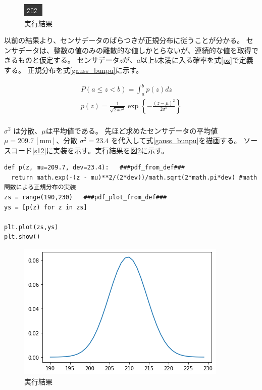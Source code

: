 \begin{figure}[htbp]
  \begin{center}
  \includegraphics[width=.1\linewidth]{img/11.png}
  \caption{実行結果}
  \label{j11}
  \end{center}
\end{figure}

以前の結果より、センサデータのばらつきが正規分布に従うことが分かる。
センサデータは、整数の値のみの離散的な値しかとらないが、連続的な値を取得できるものと仮定する。
センサデータ$z$が、$a$以上$b$未満に入る確率を式\eqref{pz}で定義する。
正規分布を式\eqref{gauss_bunpu}に示す。

\begin{align}
  P(a \leq z < b) = \int_{a}^{b} p(z) dz \label{pz} \\
  p(z) = \frac{1}{\sqrt{2\pi\sigma^2}}\exp \left\{-\frac{(z-\mu)^2}{2\sigma^2}\right\} \label{gauss_bunpu}
\end{align}
\\
$\sigma^2$ は分散、$\mu$は平均値である。
先ほど求めたセンサデータの平均値 $\mu = 209.7 \mathrm{\,[mm]}$、分散 $\sigma^2 = 23.4$ を代入して式\eqref{gauss_bunpu}を描画する。
ソースコード\ref{s12}\cite{robo}に実装を示す。実行結果を図\ref{j12}に示す。

\begin{lstlisting}[caption=センサデータの正規分布の描画,label=s12]
def p(z, mu=209.7, dev=23.4):   ###pdf_from_def###
  return math.exp(-(z - mu)**2/(2*dev))/math.sqrt(2*math.pi*dev) #math 関数による正規分布の実装
zs = range(190,230)   ###pdf_plot_from_def###
ys = [p(z) for z in zs]

plt.plot(zs,ys)
plt.show()
\end{lstlisting}

\begin{figure}[htbp]
  \begin{center}
  \includegraphics[width=.7\linewidth]{img/12.png}
  \caption{実行結果}
  \label{j12}
  \end{center}
\end{figure}